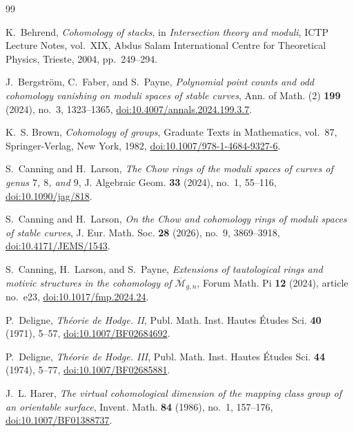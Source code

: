 \documentclass[12pt,reqno]{amsart}
\theoremstyle{definition}
\theoremstyle{remark}
\begin{document}
\begin{thebibliography}{99}

K.~Behrend,
\emph{Cohomology of stacks},
in \emph{Intersection theory and moduli}, ICTP Lecture Notes, vol.~XIX,
Abdus Salam International Centre for Theoretical Physics, Trieste, 2004,
pp.~249--294.

J.~Bergstr\"om, C.~Faber, and S.~Payne,
\emph{Polynomial point counts and odd cohomology vanishing on moduli spaces
of stable curves},
Ann. of Math. (2) \textbf{199} (2024), no.~3, 1323--1365,
\href{https://doi.org/10.4007/annals.2024.199.3.7}
{doi:10.4007/annals.2024.199.3.7}.

K.~S. Brown,
\emph{Cohomology of groups},
Graduate Texts in Mathematics, vol.~87, Springer-Verlag, New York, 1982,
\href{https://doi.org/10.1007/978-1-4684-9327-6}
{doi:10.1007/978-1-4684-9327-6}.

S.~Canning and H.~Larson,
\emph{The Chow rings of the moduli spaces of curves of genus $7$, $8$, and
$9$},
J. Algebraic Geom. \textbf{33} (2024), no.~1, 55--116,
\href{https://doi.org/10.1090/jag/818}{doi:10.1090/jag/818}.

S.~Canning and H.~Larson,
\emph{On the Chow and cohomology rings of moduli spaces of stable curves},
J. Eur. Math. Soc. \textbf{28} (2026), no.~9, 3869--3918,
\href{https://doi.org/10.4171/JEMS/1543}{doi:10.4171/JEMS/1543}.

S.~Canning, H.~Larson, and S.~Payne,
\emph{Extensions of tautological rings and motivic structures in the
cohomology of $\overline{\mathcal M}_{g,n}$},
Forum Math. Pi \textbf{12} (2024), article no.~e23,
\href{https://doi.org/10.1017/fmp.2024.24}{doi:10.1017/fmp.2024.24}.

P.~Deligne,
\emph{Th\'eorie de Hodge. II},
Publ. Math. Inst. Hautes \'Etudes Sci. \textbf{40} (1971), 5--57,
\href{https://doi.org/10.1007/BF02684692}{doi:10.1007/BF02684692}.

P.~Deligne,
\emph{Th\'eorie de Hodge. III},
Publ. Math. Inst. Hautes \'Etudes Sci. \textbf{44} (1974), 5--77,
\href{https://doi.org/10.1007/BF02685881}{doi:10.1007/BF02685881}.

J.~L. Harer,
\emph{The virtual cohomological dimension of the mapping class group of an
orientable surface},
Invent. Math. \textbf{84} (1986), no.~1, 157--176,
\href{https://doi.org/10.1007/BF01388737}{doi:10.1007/BF01388737}.


\end{thebibliography}
\end{document}

